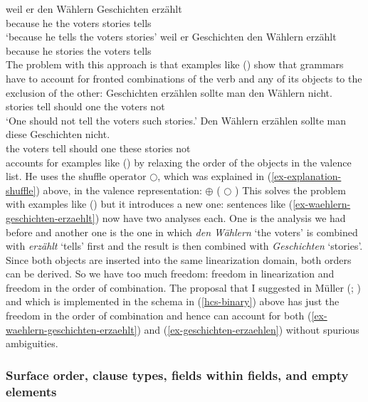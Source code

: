 \documentclass[output=paper,biblatex,babelshorthands,newtxmath,draftmode,colorlinks,citecolor=brown]{langscibook}
\begin{document}
\eal
\label{ex-waehlern-geschichten-erzaehlt}
\ex 
\gll weil er den Wählern Geschichten erzählt\\
     because he the voters stories tells\\\german
\glt `because he tells the voters stories'
\ex 
\gll weil er Geschichten den Wählern erzählt\\
     because he stories the voters tells\\
\zl
The problem with this approach is that examples like () show that grammars have to account
for fronted combinations of the verb and any of its objects to the exclusion of the other:
\eal
\label{ex-geschichten-erzaehlen}
\ex 
\gll Geschichten erzählen sollte man den Wählern nicht.\\
     stories     tell     should one the voters not\\\german
\glt `One should not tell the voters such stories.'
\ex 
\gll Den Wählern erzählen sollte man diese Geschichten nicht.\\
     the voters  tell     should one these stories not\\
\zl
\citet[Section~8.9]{Kathol2000a} accounts for examples like () by relaxing the order of the
objects in the valence list. He uses the shuffle operator $\bigcirc$, which was explained in
(\ref{ex-explanation-shuffle}) above,  in the valence representation:  
\ea
{} $\oplus$ ( $\bigcirc$ )
\z
This solves the problem with examples like () but it introduces a new one: sentences like
(\ref{ex-waehlern-geschichten-erzaehlt}) now have two analyses each. One is the analysis we had
before and another one is the one in which \emph{den Wählern} `the voters' is combined with
\emph{erzählt} `tells' first and the result is then combined with \emph{Geschichten}
`stories'. Since both objects are inserted into the same linearization domain, both orders can be
derived. So we have too much freedom: freedom in linearization and freedom in the order of
combination. The proposal that I suggested in Müller (\citeyear[Section~2.1]{Mueller2005c};
\citeyear[Section~2.2.1]{MuellerGS}) and which is implemented in the schema in (\ref{hcs-binary}) above has
just the freedom in the order of combination and hence can account for both
(\ref{ex-waehlern-geschichten-erzaehlt}) and (\ref{ex-geschichten-erzaehlen}) without spurious
ambiguities.


\subsubsection{Surface order, clause types, fields within fields, and empty elements}
\label{sec-surface-order}
\end{document}
